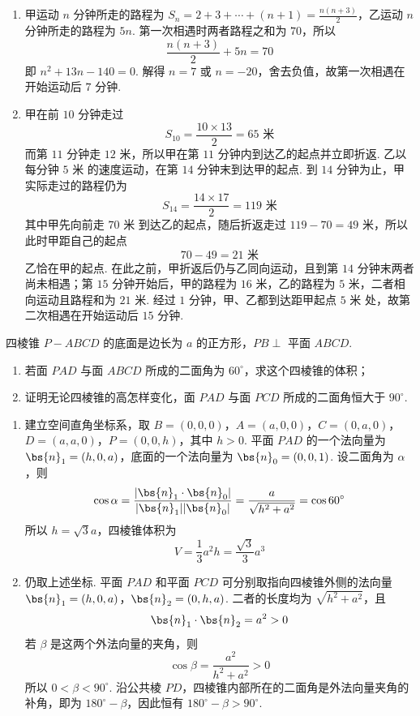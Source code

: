 \begin{solution}
\begin{enumerate}
\item 甲运动 \(n\) 分钟所走的路程为 \(S_n=2+3+\cdots+(n+1)=\frac{n(n+3)}{2}\)，乙运动 \(n\) 分钟所走的路程为 \(5n\). 第一次相遇时两者路程之和为 \(70\)，所以
\[
\frac{n(n+3)}{2}+5n=70
\]
即 \(n^{2}+13n-140=0\). 解得 \(n=7\) 或 \(n=-20\)，舍去负值，故第一次相遇在开始运动后 \(7\) 分钟.
\item 甲在前 \(10\) 分钟走过
\[
S_{10}=\frac{10\times13}{2}=65\text{ 米}
\]
而第 \(11\) 分钟走 \(12\text{ 米}\)，所以甲在第 \(11\) 分钟内到达乙的起点并立即折返. 乙以每分钟 \(5\text{ 米}\) 的速度运动，在第 \(14\) 分钟末到达甲的起点. 到 \(14\) 分钟为止，甲实际走过的路程仍为
\[
S_{14}=\frac{14\times17}{2}=119\text{ 米}
\]
其中甲先向前走 \(70\text{ 米}\) 到达乙的起点，随后折返走过 \(119-70=49\text{ 米}\)，所以此时甲距自己的起点
\[
70-49=21\text{ 米}
\]
乙恰在甲的起点. 在此之前，甲折返后仍与乙同向运动，且到第 \(14\) 分钟末两者尚未相遇；第 \(15\) 分钟开始后，甲的路程为 \(16\text{ 米}\)，乙的路程为 \(5\text{ 米}\)，二者相向运动且路程和为 \(21\text{ 米}\). 经过 \(1\) 分钟，甲、乙都到达距甲起点 \(5\text{ 米}\) 处，故第二次相遇在开始运动后 \(15\) 分钟.
\end{enumerate}
\end{solution}

\begin{problem}
四棱锥 \(P - ABCD\) 的底面是边长为 \(a\) 的正方形，\(PB \perp\) 平面 \(ABCD\).
\begin{enumerate}
\item 若面 \(PAD\) 与面 \(ABCD\) 所成的二面角为 \(60^{\circ}\)，求这个四棱锥的体积；
\item 证明无论四棱锥的高怎样变化，面 \(PAD\) 与面 \(PCD\) 所成的二面角恒大于 \(90^{\circ}\).
\end{enumerate}

\FloatBarrier
\end{problem}

\begin{solution}
\begin{enumerate}
\item 建立空间直角坐标系，取 \(B=(0,0,0)\)，\(A=(a,0,0)\)，\(C=(0,a,0)\)，\(D=(a,a,0)\)，\(P=(0,0,h)\)，其中 \(h>0\). 平面 \(PAD\) 的一个法向量为 \(\bs{n}_1=(h,0,a)\)，底面的一个法向量为 \(\bs{n}_0=(0,0,1)\). 设二面角为 \(\alpha\)，则
\[
\cos\alpha=\frac{|\bs{n}_1\cdot\bs{n}_0|}{|\bs{n}_1||\bs{n}_0|}=\frac{a}{\sqrt{h^{2}+a^{2}}}=\cos60^{\circ}
\]
所以 \(h=\sqrt3a\)，四棱锥体积为
\[
V=\frac13a^{2}h=\frac{\sqrt3}{3}a^{3}
\]
\item 仍取上述坐标. 平面 \(PAD\) 和平面 \(PCD\) 可分别取指向四棱锥外侧的法向量
\(\bs{n}_1=(h,0,a)\)，\(\bs{n}_2=(0,h,a)\).
二者的长度均为 \(\sqrt{h^{2}+a^{2}}\)，且
\[
\bs{n}_1\cdot\bs{n}_2=a^{2}>0
\]
若 \(\beta\) 是这两个外法向量的夹角，则
\[
\cos\beta=\frac{a^{2}}{h^{2}+a^{2}}>0
\]
所以 \(0<\beta<90^{\circ}\). 沿公共棱 \(PD\)，四棱锥内部所在的二面角是外法向量夹角的补角，即为 \(180^{\circ}-\beta\)，因此恒有 \(180^{\circ}-\beta>90^{\circ}\).
\end{enumerate}
\end{solution}

